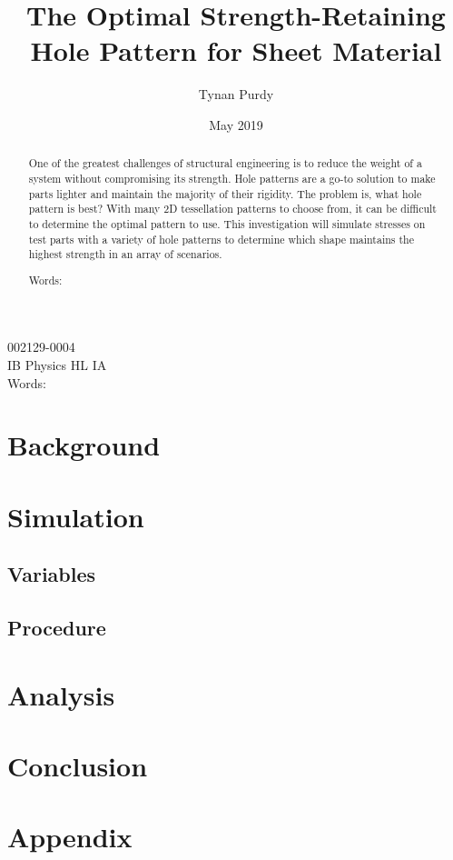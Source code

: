 \documentclass[12pt, letterpaper]{article}
\title{The Optimal Strength-Retaining Hole Pattern for Sheet Material}
\author{Tynan Purdy}
\date{May 2019}
\begin{document}
\large
\doublespace{}
\parindent=0.5in

{\fontsize{12}{14.4}
  {\singlespace
    \maketitle
    \begin{center}
    002129-0004 \\
    \vspace{4mm}
    IB Physics HL IA \\
    \vspace{4mm}
    Words:  \\ %
    \end{center}
  }
}	

\newpage
{}

\begin{abstract}
One of the greatest challenges of structural engineering is to reduce the weight of a system without compromising its strength. Hole patterns are a go-to solution to make parts lighter and maintain the majority of their rigidity. The problem is, what hole pattern is best? With many 2D tessellation patterns to choose from, it can be difficult to determine the optimal pattern to use. This investigation will simulate stresses on test parts with a variety of hole patterns to determine which shape maintains the highest strength in an array of scenarios. 

Words: %

\end{abstract}

\newpage
\tableofcontents
\newpage

\section{Background}



\section{Simulation}

\subsection{Variables}

\subsection{Procedure}

\section{Analysis}

\section{Conclusion}

\newpage
\printbibliography{}

\newpage
\section{Appendix}
\listoffigures{}
\end{document}
